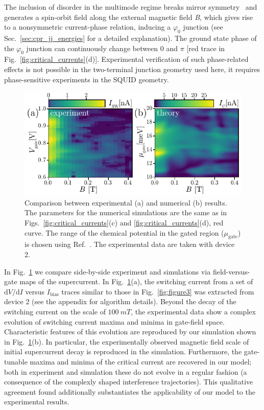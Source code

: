 The inclusion of disorder in the multimode regime breaks mirror symmetry~\cite{Yokoyama2014,Yokoyama2014a} and generates a spin-orbit field along the external magnetic field \textit{B}, which gives rise to a nonsymmetric current-phase relation, inducing a $\varphi_0$ junction (see Sec.~\ref{sec:cpr_jj_energies} for a detailed explanation).
The ground state phase of the $\varphi_0$ junction can continuously change between 0 and $\pi$ [red trace in Fig.~\ref{fig:critical_currents}(d)].
Experimental verification of such phase-related effects is not possible in the two-terminal junction geometry used here, it requires phase-sensitive experiments in the SQUID geometry.

\begin{figure}
\begin{center}
\includegraphics[width=0.7\columnwidth]{chapter_supercurrent/figures/fig5.pdf}
\caption{Comparison between experimental (a) and numerical (b) results.
The parameters for the numerical simulations are the same as in Figs.~\ref{fig:critical_currents}(c) and \ref{fig:critical_currents}(d), red curve.
The range of the chemical potential in the gated region ($\mu_{\textrm{gate}}$) is chosen using Ref.~\cite{Vuik2016}.
The experimental data are taken with device 2.}
\label{fig:figure5}
\end{center}
\end{figure}

In Fig.~\ref{fig:figure5} we compare side-by-side experiment and simulations via field-versus-gate maps of the supercurrent.
In Fig.~\ref{fig:figure5}(a), the switching current from a set of $\mathrm{d}V/\mathrm{d}I$ versus $I_\textrm{bias}$ traces similar to those in Fig.~\ref{fig:figure3} was extracted from device 2 (see the appendix for algorithm details).
Beyond the decay of the switching current on the scale of $\SI{100}{mT}$, the experimental data show a complex evolution of switching current maxima and minima in gate-field space.
Characteristic features of this evolution are reproduced by our simulation shown in Fig.~\ref{fig:figure5}(b).
In particular, the experimentally observed magnetic field scale of initial supercurrent decay is reproduced in the simulation.
Furthermore, the gate-tunable maxima and minima of the critical current are recovered in our model; both in experiment and simulation these do not evolve in a regular fashion (a consequence of the complexly shaped interference trajectories).
This qualitative agreement found additionally substantiates the applicability of our model to the experimental results.


